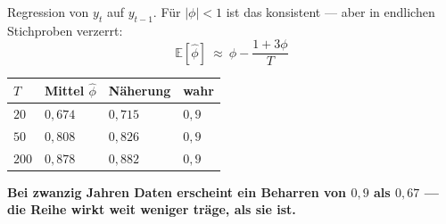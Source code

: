 \begin{merksatz}
Regression von $y_t$ auf $y_{t-1}$. Für $|\phi|<1$ ist das konsistent --- aber in endlichen Stichproben verzerrt:
\[ \mathbb{E}[\hat\phi] \ \approx\ \phi - \frac{1+3\phi}{T} \]

\begin{center}
{\small
\renewcommand{\arraystretch}{1.48}
\begin{tabular}{@{}P{1.4cm}P{2.2cm}P{2.2cm}P{1.8cm}@{}}
\toprule
$T$ & \textbf{Mittel} $\hat\phi$ & \textbf{Näherung} & \textbf{wahr}\\
\midrule
$20$ & $0{,}674$ & $0{,}715$ & $0{,}9$\\
$50$ & $0{,}808$ & $0{,}826$ & $0{,}9$\\
$200$ & $0{,}878$ & $0{,}882$ & $0{,}9$\\
\bottomrule
\end{tabular}}
\end{center}

\begin{center}
\begin{minipage}{0.9\textwidth}
\textbf{Bei zwanzig Jahren Daten erscheint ein Beharren von $0{,}9$ als $0{,}67$ --- die Reihe wirkt weit weniger träge, als sie ist.}
\end{minipage}
\end{center}

\begin{center}
\begin{minipage}{0.88\textwidth}
\end{minipage}
\end{center}
\end{merksatz}


